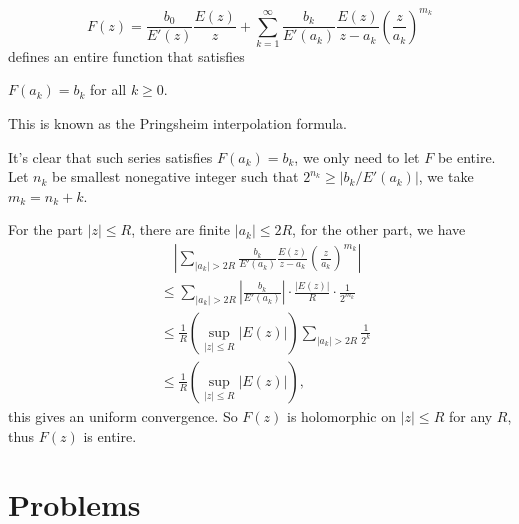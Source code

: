 \documentclass[11pt]{report}
\theoremstyle{mythm}
\let\oldendproof\endproof
\renewenvironment{proof}[1][\proofname]{%
  \oldproof[\normalfont \bfseries #1]%
}{\oldendproof}
\renewcommand*{\proofname}{Proof}
\theoremstyle{myans}
\begin{document}
\begin{enumerate}
\begin{enumerate}
    \[ F(z) = \frac{b_0}{E'(z)} \frac{E(z)}{z} + \sum_{k=1}^\infty
    \frac{b_k}{E'(a_k)} \frac{E(z)}{z-a_k}\left(\frac{z}{a_k}\right)^{m_k} \]
    defines an entire function that satisfies
    \begin{center}
      $F(a_k) = b_k$ \quad for all $k\geq 0$.
    \end{center}
    This is known as the Pringsheim interpolation formula.
    \begin{proof}
      It's clear that such series satisfies $F(a_k) = b_k$, we only need to let $F$ be entire.
      Let $n_k$ be smallest nonegative integer such that $2^{n_k} \geq |b_k / E'(a_k)|$, we take
      $m_k = n_k + k$.

      For the part $|z| \leq R$, there are finite $|a_k| \leq 2R$, for the other part, we have
      \begin{align*}
        &\quad \left|\sum_{|a_k| > 2R} \frac{b_k}{E'(a_k)} \frac{E(z)}{z-a_k}\left(\frac{z}{a_k}\right)^{m_k}\right|\\
        &\leq \sum_{|a_k| > 2R} \left|\frac{b_k}{E'(a_k)}\right| \cdot \frac{|E(z)|}{R} \cdot \frac 1{2^{m_k}}\\
        &\leq \frac 1{R} \left( \sup_{|z|\leq R} |E(z)| \right) \sum_{|a_k| > 2R} \frac 1{2^k}\\
        &\leq \frac 1{R} \left( \sup_{|z|\leq R} |E(z)| \right),
      \end{align*}
      this gives an uniform convergence. So $F(z)$ is holomorphic on $|z|\leq R$ for any $R$, thus $F(z)$ is entire.
    \end{proof}
  \end{enumerate}
\end{enumerate}

\section{Problems}
\end{document}

